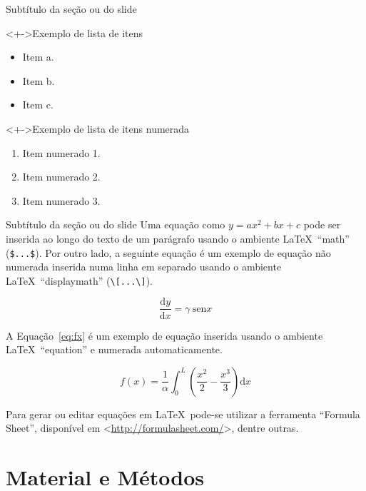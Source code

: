 \documentclass[%
  10pt,%
  aspectratio = 169,%
  compress,%
  t,%
]{beamer}%
\begin{document}
\begin{frame}{}{Subtítulo da seção ou do slide}
\begin{block}<+->{Exemplo de lista de itens}
\begin{itemize}
\item Item a.
\item Item b.
\item Item c.
\end{itemize}
\end{block}
\begin{block}<+->{Exemplo de lista de itens numerada}
\begin{enumerate}[<+-|alert@+>]
\item Item numerado 1.
\item Item numerado 2.
\item Item numerado 3.
\end{enumerate}
\end{block}
\end{frame}

\begin{frame}[fragile = singleslide]{}{Subtítulo da seção ou do slide}
Uma equação como $y = a x^2 + b x + c$ pode ser inserida ao longo do texto de um parágrafo usando o ambiente \LaTeX\ ``math'' (\verb|$...$|). Por outro lado, a seguinte equação é um exemplo de equação não numerada inserida numa linha em separado usando o ambiente \LaTeX\ ``displaymath'' (\verb|\[...\]|).
\begin{block}{}
\[
\frac{\mathrm{d}y}{\mathrm{d}x} = \gamma \ \mathrm{sen} x
\]
\end{block}
A Equação~\eqref{eq:fx} é um exemplo de equação inserida usando o ambiente \LaTeX\ ``equation'' e numerada automaticamente.
\begin{block}{}
\begin{equation}\label{eq:fx}
f(x) = \frac{1}{\alpha} \int^L_0 \left(\frac{x^2}{2} - \frac{x^3}{3}\right) \mathrm{d}x
\end{equation}
\end{block}
Para gerar ou editar equações em \LaTeX\ pode-se utilizar a ferramenta ``Formula Sheet'', disponível em <\url{http://formulasheet.com/}>, dentre outras.
\end{frame}

\section{Material e Métodos}\label{sec:matmet}
\end{document}
